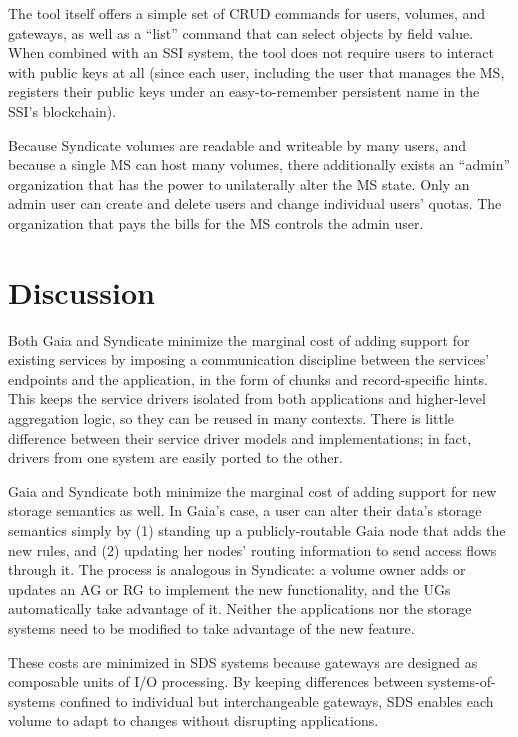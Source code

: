 The tool itself offers a simple set of CRUD commands for users, volumes, and
gateways, as well as a ``list'' command that can select objects by field value.
When combined with an SSI system, the tool does not require users to interact with
public keys at all (since each user, including the user that manages the MS,
registers their public keys under an easy-to-remember persistent name in the
SSI's blockchain).

Because Syndicate volumes are readable and writeable by many users, and because
a single MS can host many volumes, there additionally exists an ``admin''
organization that has the power to unilaterally alter the MS state.  Only an
admin user can create and delete users and change individual users' quotas.
The organization that pays the bills for the MS controls the admin user.

\section{Discussion}

Both Gaia and Syndicate minimize the marginal cost of adding support for
existing services by imposing a communication discipline between the services'
endpoints and the application, in the form of chunks and record-specific hints.
This keeps the service drivers isolated from both applications and higher-level
aggregation logic, so they can be reused in many contexts.  There is little
difference between their service driver models and implementations; in fact,
drivers from one system are easily ported to the other.

Gaia and Syndicate both minimize the marginal cost of adding support for new
storage semantics as well.  In Gaia's case, a user can alter their data's
storage semantics simply by (1) standing up a publicly-routable Gaia node that adds the new
rules, and (2) updating her nodes' routing information to send access
flows through it.  The process is analogous in
Syndicate:  a volume owner adds or updates an AG or RG to implement the new
functionality, and the UGs automatically take advantage of it.
Neither the applications nor the
storage systems need to be modified to take advantage of the new
feature.

These costs are minimized in SDS systems because gateways are designed as
composable units of I/O processing.  By keeping
differences between systems-of-systems confined to individual but
interchangeable gateways, SDS enables each volume to adapt to
changes without disrupting applications.

